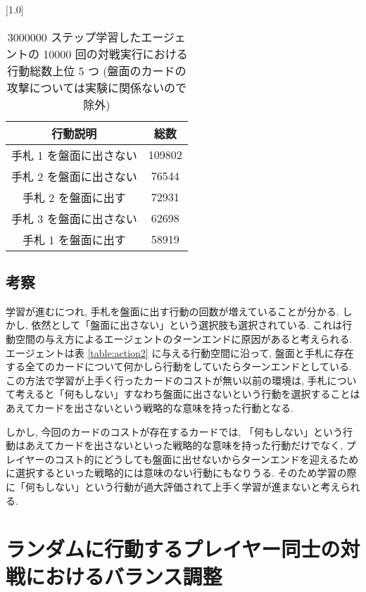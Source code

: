 \documentclass{jarticle}     %
\begin{document}
      \begin{table}[ht]
        \centering
        \caption{3000000 ステップ学習したエージェントの 10000 回の対戦実行における行動総数上位 5 つ (盤面のカードの攻撃については実験に関係ないので除外)}
        \vspace{-0.3cm}
        \label{table:3000000action}
        \scalebox{1.0}[1.0]{
          \begin{tabular}{|c|c|}
            \hline
            行動説明 & 総数 \\ \hline
            手札 1 を盤面に出さない & 109802 \\ \hline
            手札 2 を盤面に出さない & 76544 \\ \hline
            手札 2 を盤面に出す & 72931 \\ \hline
            手札 3 を盤面に出さない & 62698 \\ \hline
            手札 1 を盤面に出す & 58919 \\ \hline
            \end{tabular}
        }
        \end{table}

  \subsection{考察}
  学習が進むにつれ, 手札を盤面に出す行動の回数が増えていることが分かる.
  しかし, 依然として「盤面に出さない」という選択肢も選択されている. これは行動空間の与え方によるエージェントのターンエンドに原因があると考えられる. エージェントは表 \ref{table:action2} に与える行動空間に沿って, 盤面と手札に存在する全てのカードについて何かしら行動をしていたらターンエンドとしている. この方法で学習が上手く行ったカードのコストが無い以前の環境は, 手札について考えると「何もしない」すなわち盤面に出さないという行動を選択することはあえてカードを出さないという戦略的な意味を持った行動となる.\par
  しかし, 今回のカードのコストが存在するカードでは, 「何もしない」という行動はあえてカードを出さないといった戦略的な意味を持った行動だけでなく, プレイヤーのコスト的にどうしても盤面に出せないからターンエンドを迎えるために選択するといった戦略的には意味のない行動にもなりうる. そのため学習の際に「何もしない」という行動が過大評価されて上手く学習が進まないと考えられる.

\section{ランダムに行動するプレイヤー同士の対戦におけるバランス調整}
\end{document}

